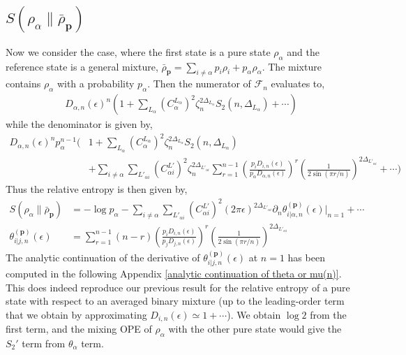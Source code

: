 \documentclass[11pt]{article}
\newcommand{\ep}{\epsilon}
\newcommand{\p}{\partial}
\newcommand{\nn}{\nonumber}
\newcommand{\lb}{\left(}
\newcommand{\rb}{\right)}
\begin{document}
\subsection{\texorpdfstring{$S(\rho_\alpha\|\bar{\rho}_\textbf{p})$}{S rho alpha wrt rho bar p}}
Now we consider the case, where the first state is a pure state $\rho_\alpha$ and the reference state is a general mixture, $\bar\rho_\textbf{p} =\displaystyle \sum_{i\neq \alpha} p_i\rho_i + p_\alpha \rho_\alpha$. The mixture contains $\rho_\alpha$ with a probability $p_\alpha$. 
Then the numerator of $\mathcal{F}_n$ evaluates to,
\begin{align}
    D_{\alpha,n}(\ep)^n \displaystyle\lb 1+ \sum_{L_{\alpha}}{(C^{L_\alpha}_\alpha)}^2 \zeta_n^{2\Delta_{L_\alpha}}S_2(n,\Delta_{L_{\alpha}})+\cdots\rb
\end{align}
while the denominator is given by,
\begin{align}
    D_{\alpha,n}(\ep)^n p_\alpha^{n-1}\displaystyle\Bigg( &1 + \sum_{L_{\alpha}}{(C^{L_\alpha}_\alpha)}^2 \zeta_n^{2\Delta_{L_{\alpha}}}S_2(n,\Delta_{L_{\alpha}}) \nn\\
    &+ \displaystyle\sum_{i\neq \alpha}\sum_{L'_{\alpha i}}\lb C_{\alpha i}^{L'}\rb^2\zeta_n^{2\Delta_{L'_{\alpha i}}} \sum_{r=1}^{n-1} \lb\frac{p_iD_{i,n}(\ep)}{p_\alpha D_{\alpha,n}(\ep)}\rb^{r} \lb\frac{1}{2\sin(\pi r/n)}\rb^{2\Delta_{L'_{\alpha i}}} +\cdots \Bigg)
\end{align}
Thus the relative entropy is then given by,
\begin{align}
    S(\rho_\alpha \| \bar\rho_\textbf{p}) &= -\log p_\alpha - \sum_{i\neq \alpha}\sum_{L'_{\alpha i}}\lb C_{\alpha i}^{L'}\rb^2 (2\pi \ep)^{2\Delta_{L'_{\alpha i}}} \p_n  \theta_{i|\alpha,n}^{(\textbf{p})}(\ep) \Big|_{n=1} +\cdots \\
    \theta_{i|j,n}^{(\textbf{p})}(\ep)  &= \sum_{r=1}^{n-1}(n-r) \lb\frac{p_iD_{i,n}(\ep)}{p_jD_{j,n}(\ep)}\rb^r \lb\frac{1}{2\sin (\pi r/n)}\rb^{2\Delta_{L'_{\alpha i}}}
\end{align}
The analytic continuation of the derivative of $\theta_{i|j,n}^{(\textbf{p})}(\ep)$ at $n=1$ has been computed in the following Appendix \ref{analytic continuation of theta or mu(n)}. 
This does indeed reproduce our previous result for the relative entropy of a pure state with respect to an averaged binary mixture (up to the leading-order term that we obtain by approximating $D_{i,n}(\ep) \simeq 1 + \cdots$). We obtain $\log 2$ from the first term, and the mixing OPE of $\rho_\alpha$ with the other pure state would give the $S_2'$ term from $\theta_\alpha$ term. 
\end{document}
